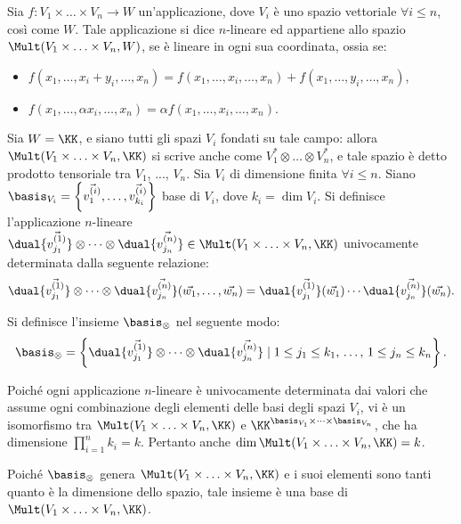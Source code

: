 \documentclass[10pt,landscape]{article}
\begin{document}
\begin{multicols}{3}
		Sia $f : V_1 \times \ldots \times V_n \to W$ un'applicazione, dove
		$V_i$ è uno spazio vettoriale $\forall i \leq n$, così come $W$. Tale
		applicazione si dice $n$-lineare ed appartiene allo spazio
		$\Mult(V_1 \times \ldots \times V_n, W)$, se è lineare in ogni sua coordinata, ossia se:
		
		\begin{itemize}
			\item $f(x_1, \ldots, x_i + y_i, \ldots, x_n) =
			f(x_1, \ldots, x_i, \ldots, x_n) + f(x_1, \ldots, y_i, \ldots, x_n)$,
			\item $f(x_1, \ldots, \alpha x_i, \ldots, x_n) = \alpha f(x_1, \ldots, x_i, \ldots, x_n)$.
		\end{itemize}
		
		Sia $W=\KK$, e siano tutti gli spazi $V_i$ fondati su tale campo: allora
		$\Mult(V_1 \times \ldots \times V_n, \KK)$ si scrive anche come $V_1^* \otimes \ldots \otimes V_n^*$, e tale spazio
		è detto prodotto tensoriale tra $V_1$, ..., $V_n$.
		Sia $V_i$ di dimensione finita $\forall i \leq n$. Siano $\basis_{V_i} = \left\{ \vec{v^{(i)}_1}, \ldots,  \vec{v^{(i)}_{k_i}} \right\}$ base
		di $V_i$, dove $k_i = \dim V_i$.
		Si definisce l'applicazione $n$-lineare $\dual{\vec{v^{(1)}_{j_1}}}
		\otimes \cdots \otimes \dual{\vec{v^{(n)}_{j_n}}}\in \Mult(V_1 \times \ldots
		\times V_n, \KK)$ univocamente determinata dalla seguente relazione:
		\[ \dual{\vec{v^{(1)}_{j_1}}} \otimes \cdots \otimes \dual{\vec{v^{(n)}_{j_n}}}(\vec{w_1}, \ldots, \vec{w_n}) = \dual{\vec{v^{(1)}_{j_1}}}(\vec{w_1}) \cdots \dual{\vec{v^{(n)}_{j_n}}}(\vec{w_n}).   \]
		
		Si definisce l'insieme $\basis_{\otimes}$ nel seguente modo:
		\[ \basis_{\otimes} = \left\{ \dual{\vec{v^{(1)}_{j_1}}} \otimes \cdots \otimes \dual{\vec{v^{(n)}_{j_n}}} \mid 1 \leq j_1 \leq k_1, \, \ldots, \, 1 \leq j_n \leq k_n \right\}. \]
		
		Poiché ogni applicazione $n$-lineare è univocamente determinata
		dai valori che assume ogni combinazione degli elementi delle basi
		degli spazi $V_i$, vi è un isomorfismo tra $\Mult(V_1 \times \ldots
		\times V_n, \KK)$ e $\KK^{\basis_{V_1} \times \cdots \times \basis_{V_n}}$, che ha dimensione $\prod_{i=1}^n k_i = k$. Pertanto
		anche $\dim \Mult(V_1 \times \ldots \times V_n, \KK) = k$.
		
		Poiché $\basis_{\otimes}$ genera $\Mult(V_1 \times \ldots
		\times V_n, \KK)$ e i suoi elementi sono tanti quanto è la
		dimensione dello spazio, tale insieme è una base di $\Mult(V_1 \times 
		\ldots \times V_n, \KK)$.
		

\end{multicols}
\end{document}

